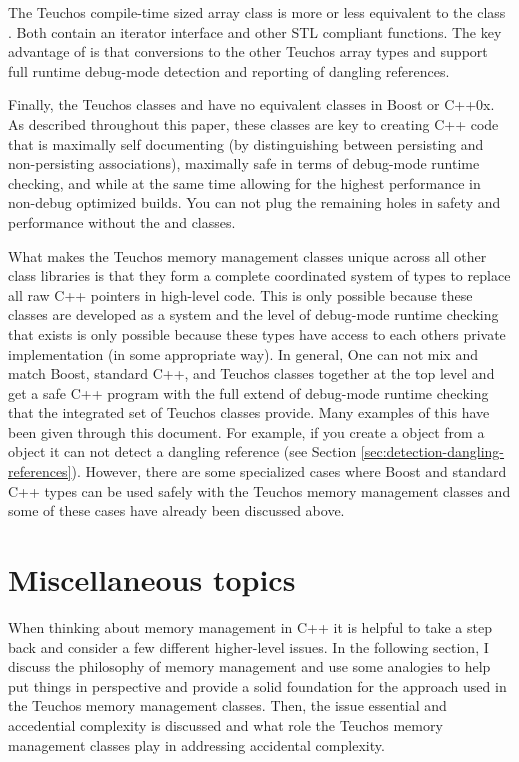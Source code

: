 \documentclass[pdf,ps2pdf,11pt]{SANDreport}
\begin{document}
The Teuchos compile-time sized array class {} is more or
less equivalent to the class {}.  Both contain an
iterator interface and other STL compliant functions.  The key
advantage of {} is that conversions to the other Teuchos
array types {} and {} support full
runtime debug-mode detection and reporting of dangling references.

Finally, the Teuchos classes {} and {} have no
equivalent classes in Boost or C++0x.  As described throughout this
paper, these classes are key to creating C++ code that is maximally
self documenting (by distinguishing between persisting and
non-persisting associations), maximally safe in terms of debug-mode
runtime checking, and while at the same time allowing for the highest
performance in non-debug optimized builds.  You can not plug the
remaining holes in safety and performance without the {} and
{} classes.

What makes the Teuchos memory management classes unique across all
other class libraries is that they form a complete coordinated system
of types to replace all raw C++ pointers in high-level code.  This is
only possible because these classes are developed as a system and the
level of debug-mode runtime checking that exists is only possible
because these types have access to each others private implementation
(in some appropriate way).  In general, One can not mix and match
Boost, standard C++, and Teuchos classes together at the top level and
get a safe C++ program with the full extend of debug-mode runtime
checking that the integrated set of Teuchos classes provide.  Many
examples of this have been given through this document.  For example,
if you create a {} object from a {}
object it can not detect a dangling reference (see Section
{}\ref{sec:detection-dangling-references}).  However, there are some
specialized cases where Boost and standard C++ types can be used
safely with the Teuchos memory management classes and some of these
cases have already been discussed above.


%
{}\section{Miscellaneous topics}
%

When thinking about memory management in C++ it is helpful to take a
step back and consider a few different higher-level issues.  In the
following section, I discuss the philosophy of memory management and
use some analogies to help put things in perspective and provide a
solid foundation for the approach used in the Teuchos memory
management classes.  Then, the issue essential and accedential
complexity is discussed and what role the Teuchos memory management
classes play in addressing accidental complexity.
\end{document}
